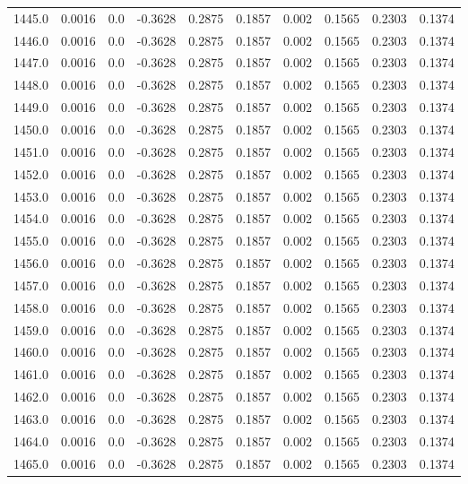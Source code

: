 \begin{longtable}{lrrrrrrrrr}
1445.0 & 0.0016 & 0.0 & -0.3628 & 0.2875 & 0.1857 & 0.002 & 0.1565 & 0.2303 & 0.1374 \\
1446.0 & 0.0016 & 0.0 & -0.3628 & 0.2875 & 0.1857 & 0.002 & 0.1565 & 0.2303 & 0.1374 \\
1447.0 & 0.0016 & 0.0 & -0.3628 & 0.2875 & 0.1857 & 0.002 & 0.1565 & 0.2303 & 0.1374 \\
1448.0 & 0.0016 & 0.0 & -0.3628 & 0.2875 & 0.1857 & 0.002 & 0.1565 & 0.2303 & 0.1374 \\
1449.0 & 0.0016 & 0.0 & -0.3628 & 0.2875 & 0.1857 & 0.002 & 0.1565 & 0.2303 & 0.1374 \\
1450.0 & 0.0016 & 0.0 & -0.3628 & 0.2875 & 0.1857 & 0.002 & 0.1565 & 0.2303 & 0.1374 \\
1451.0 & 0.0016 & 0.0 & -0.3628 & 0.2875 & 0.1857 & 0.002 & 0.1565 & 0.2303 & 0.1374 \\
1452.0 & 0.0016 & 0.0 & -0.3628 & 0.2875 & 0.1857 & 0.002 & 0.1565 & 0.2303 & 0.1374 \\
1453.0 & 0.0016 & 0.0 & -0.3628 & 0.2875 & 0.1857 & 0.002 & 0.1565 & 0.2303 & 0.1374 \\
1454.0 & 0.0016 & 0.0 & -0.3628 & 0.2875 & 0.1857 & 0.002 & 0.1565 & 0.2303 & 0.1374 \\
1455.0 & 0.0016 & 0.0 & -0.3628 & 0.2875 & 0.1857 & 0.002 & 0.1565 & 0.2303 & 0.1374 \\
1456.0 & 0.0016 & 0.0 & -0.3628 & 0.2875 & 0.1857 & 0.002 & 0.1565 & 0.2303 & 0.1374 \\
1457.0 & 0.0016 & 0.0 & -0.3628 & 0.2875 & 0.1857 & 0.002 & 0.1565 & 0.2303 & 0.1374 \\
1458.0 & 0.0016 & 0.0 & -0.3628 & 0.2875 & 0.1857 & 0.002 & 0.1565 & 0.2303 & 0.1374 \\
1459.0 & 0.0016 & 0.0 & -0.3628 & 0.2875 & 0.1857 & 0.002 & 0.1565 & 0.2303 & 0.1374 \\
1460.0 & 0.0016 & 0.0 & -0.3628 & 0.2875 & 0.1857 & 0.002 & 0.1565 & 0.2303 & 0.1374 \\
1461.0 & 0.0016 & 0.0 & -0.3628 & 0.2875 & 0.1857 & 0.002 & 0.1565 & 0.2303 & 0.1374 \\
1462.0 & 0.0016 & 0.0 & -0.3628 & 0.2875 & 0.1857 & 0.002 & 0.1565 & 0.2303 & 0.1374 \\
1463.0 & 0.0016 & 0.0 & -0.3628 & 0.2875 & 0.1857 & 0.002 & 0.1565 & 0.2303 & 0.1374 \\
1464.0 & 0.0016 & 0.0 & -0.3628 & 0.2875 & 0.1857 & 0.002 & 0.1565 & 0.2303 & 0.1374 \\
1465.0 & 0.0016 & 0.0 & -0.3628 & 0.2875 & 0.1857 & 0.002 & 0.1565 & 0.2303 & 0.1374 \\

\end{longtable}
